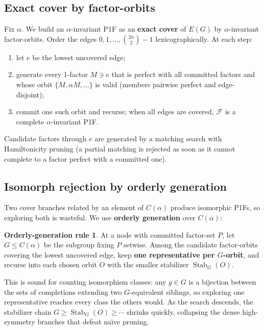 \documentclass[11pt,reqno]{amsart}
\theoremstyle{plain}
\theoremstyle{definition}
\newtheorem*{ogrule}{Orderly-generation rule}
\numberwithin{theorem}{section}
\begin{document}
\subsection{Exact cover by factor-orbits}

Fix $\alpha$. We build an $\alpha$-invariant P1F as an \textbf{exact cover} of $E(G)$ by
$\alpha$-invariant factor-orbits. Order the edges $0,1,\dots,\binom{2n}{2}-1$
lexicographically. At each step:
\begin{enumerate}
\item let $e$ be the lowest uncovered edge;
\item generate every 1-factor $M\ni e$ that is perfect with all committed factors and
whose orbit $\{M,\alpha M,\dots\}$ is valid (members pairwise perfect and
edge-disjoint);
\item commit one such orbit and recurse; when all edges are covered, $\mathcal F$ is a
complete $\alpha$-invariant P1F.
\end{enumerate}
Candidate factors through $e$ are generated by a matching search with Hamiltonicity
pruning (a partial matching is rejected as soon as it cannot complete to a factor
perfect with a committed one).

\subsection{Isomorph rejection by orderly generation}

Two cover branches related by an element of $C(\alpha)$ produce isomorphic P1Fs, so
exploring both is wasteful. We use \textbf{orderly generation} over $C(\alpha)$:

\begin{ogrule}
At a node with committed factor-set $P$, let $G\le C(\alpha)$ be the subgroup
fixing $P$ setwise. Among the candidate factor-orbits covering the lowest uncovered
edge, keep \textbf{one representative per $G$-orbit}, and recurse into each chosen orbit
$O$ with the smaller stabilizer $\operatorname{Stab}_G(O)$.
\end{ogrule}

This is sound for counting isomorphism classes: any $g\in G$ is a bijection between
the sets of completions extending two $G$-equivalent siblings, so exploring one
representative reaches every class the others would. As the search descends, the
stabilizer chain $G\ge\operatorname{Stab}_G(O)\ge\cdots$ shrinks quickly, collapsing the
dense high-symmetry branches that defeat na\"{\i}ve pruning.
\end{document}
